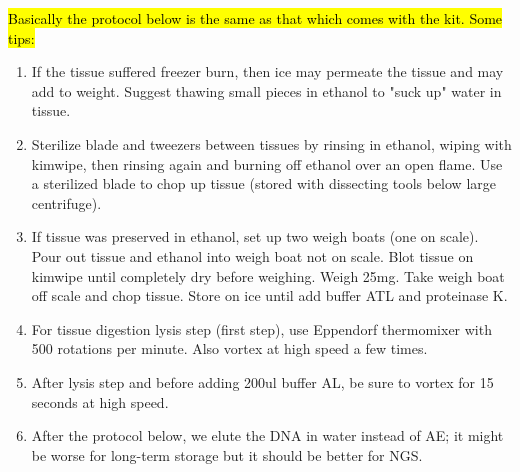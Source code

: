 \documentclass[11pt, oneside]{article}
\begin{document}
		\hl{Basically the protocol below is the same as that which comes with the kit.  Some tips: }
		\begin{enumerate}
			\item If the tissue suffered freezer burn, then ice may permeate the tissue and may add to weight.  Suggest thawing small pieces in ethanol to "suck up" water in tissue.
			\item Sterilize blade and tweezers between tissues by rinsing in ethanol, wiping with kimwipe, then rinsing again and burning off ethanol over an open flame. Use a sterilized blade to chop up tissue (stored with dissecting tools below large centrifuge).
			\item If tissue was preserved in ethanol, set up two weigh boats (one on scale).  Pour out tissue and ethanol into weigh boat not on scale.  Blot tissue on kimwipe until completely dry before weighing.  Weigh 25mg.  Take weigh boat off scale and chop tissue.  Store on ice until add buffer ATL and proteinase K.
			\item For tissue digestion lysis step (first step), use Eppendorf thermomixer with 500 rotations per minute.  Also vortex at high speed a few times.
			\item After lysis step and before adding 200ul buffer AL, be sure to vortex for 15 seconds at high speed.
		\item After the protocol below, we elute the DNA in water instead of AE; it might be worse for long-term storage but it should be better for NGS.
		\end{enumerate}
		
\end{document}
